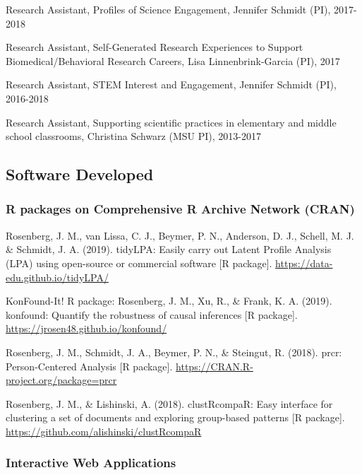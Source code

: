 \documentclass[14,]{article}
\begin{document}
Research Assistant, Profiles of Science Engagement, Jennifer Schmidt
(PI), 2017-2018

Research Assistant, Self-Generated Research Experiences to Support
Biomedical/Behavioral Research Careers, Lisa Linnenbrink-Garcia (PI),
2017

Research Assistant, STEM Interest and Engagement, Jennifer Schmidt (PI),
2016-2018

Research Assistant, Supporting scientific practices in elementary and
middle school classrooms, Christina Schwarz (MSU PI), 2013-2017

\hypertarget{software-developed}{%
\subsection{Software Developed}\label{software-developed}}

\hypertarget{r-packages-on-comprehensive-r-archive-network-cran}{%
\subsubsection{R packages on Comprehensive R Archive Network
(CRAN)}\label{r-packages-on-comprehensive-r-archive-network-cran}}

Rosenberg, J. M., van Lissa, C. J., Beymer, P. N., Anderson, D. J.,
Schell, M. J. \& Schmidt, J. A. (2019). tidyLPA: Easily carry out Latent
Profile Analysis (LPA) using open-source or commercial software {[}R
package{]}. \url{https://data-edu.github.io/tidyLPA/}

KonFound-It! R package: Rosenberg, J. M., Xu, R., \& Frank, K. A.
(2019). konfound: Quantify the robustness of causal inferences {[}R
package{]}. \url{https://jrosen48.github.io/konfound/}

Rosenberg, J. M., Schmidt, J. A., Beymer, P. N., \& Steingut, R. (2018).
prcr: Person-Centered Analysis {[}R package{]}.
\url{https://CRAN.R-project.org/package=prcr}

Rosenberg, J. M., \& Lishinski, A. (2018). clustRcompaR: Easy interface
for clustering a set of documents and exploring group-based patterns
{[}R package{]}. \url{https://github.com/alishinski/clustRcompaR}

\hypertarget{interactive-web-applications}{%
\subsubsection{Interactive Web
Applications}\label{interactive-web-applications}}
\end{document}
